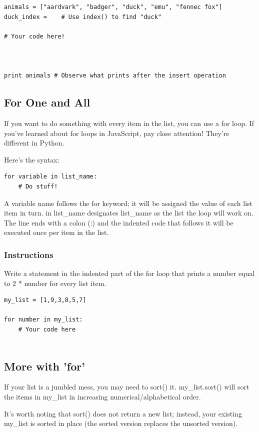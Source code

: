\documentclass[12pt,a4paper,final,twoside,onecolumn,titlepage]{book}
\begin{document}
\begin{lstlisting}
animals = ["aardvark", "badger", "duck", "emu", "fennec fox"]
duck_index =    # Use index() to find "duck"

# Your code here!



print animals # Observe what prints after the insert operation
\end{lstlisting}

\subsection{For One and All}

If you want to do something with every item in the list, you can use a for loop. If you've learned about for loops in JavaScript, pay close attention! They're different in Python.

Here's the syntax:
\begin{lstlisting}
for variable in list_name:
    # Do stuff!
\end{lstlisting}
A variable name follows the for keyword; it will be assigned the value of each list item in turn. in list\_name designates list\_name as the list the loop will work on. The line ends with a colon (:) and the indented code that follows it will be executed once per item in the list.
\subsubsection{Instructions}

Write a statement in the indented part of the for loop that prints a number equal to 2 * number for every list item.
\begin{lstlisting}
my_list = [1,9,3,8,5,7]

for number in my_list:
    # Your code here
    
\end{lstlisting}

\subsection{More with 'for'}

If your list is a jumbled mess, you may need to sort() it. my\_list.sort() will sort the items in my\_list in increasing numerical/alphabetical order.

It's worth noting that sort() does not return a new list; instead, your existing my\_list is sorted in place (the sorted version replaces the unsorted version).
\end{document}
